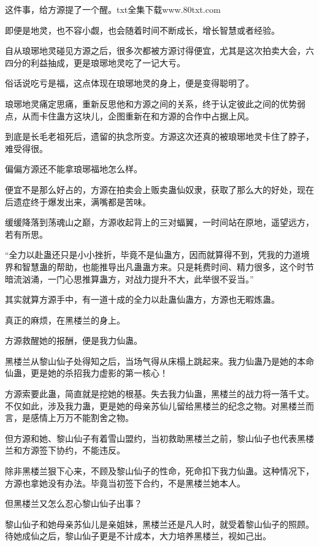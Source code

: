 
\begin{this_body}

这件事，给方源提了一个醒。txt全集下载www.80txt.com

即便是地灵，也不容小觑，也会随着时间不断成长，增长智慧或者经验。

自从琅琊地灵碰见方源之后，很多次都被方源讨得便宜，尤其是这次拍卖大会，六四分的利益抽成，更是琅琊地灵吃了一记大亏。

俗话说吃亏是福，这点体现在琅琊地灵的身上，便是变得聪明了。

琅琊地灵痛定思痛，重新反思他和方源之间的关系，终于认定彼此之间的优势弱点，从而卡住蛊方这块儿，企图重新在和方源的合作中占据上风。

到底是长毛老祖死后，遗留的执念所变。方源这次还真的被琅琊地灵卡住了脖子，难受得很。

偏偏方源还不能拿琅琊福地怎么样。

便宜不是那么好占的，方源在拍卖会上贩卖蛊仙奴隶，获取了那么大的好处，现在后遗症终于爆发出来，满嘴都是苦味。

缓缓降落到荡魂山之巅，方源收起背上的三对蝠翼，一时间站在原地，遥望远方，若有所思。

“全力以赴蛊还只是小小挫折，毕竟不是仙蛊方，因而就算得不到，凭我的力道境界和智慧蛊的帮助，也能推导出凡蛊蛊方来。只是耗费时间、精力很多，这个时节暗流汹涌，一门心思推算蛊方，对战力提升不大，此举很不妥当。”

其实就算方源手中，有一道十成的全力以赴蛊仙蛊方，方源也无暇炼蛊。

真正的麻烦，在黑楼兰的身上。

方源救醒她的报酬，便是我力仙蛊。

黑楼兰从黎山仙子处得知之后，当场气得从床榻上跳起来。我力仙蛊乃是她的本命仙蛊，更是她的杀招我力虚影的第一核心！

方源索要此蛊，简直就是挖她的根基。失去我力仙蛊，黑楼兰的战力将一落千丈。不仅如此，涉及我力蛊，更是她的母亲苏仙儿留给黑楼兰的纪念之物。对黑楼兰而言，是感情上万万不能割舍之物。

但方源和她、黎山仙子有着雪山盟约，当初救助黑楼兰之前，黎山仙子也代表黑楼兰和方源签下协约，不能违反。

除非黑楼兰狠下心来，不顾及黎山仙子的性命，死命扣下我力仙蛊。这种情况下，方源也拿她没有办法。毕竟当初签下合约，不是黑楼兰她本人。

但黑楼兰又怎么忍心黎山仙子出事？

黎山仙子和她母亲苏仙儿是亲姐妹，黑楼兰还是凡人时，就受着黎山仙子的照顾。待她成仙之后，黎山仙子更是不计成本，大力培养黑楼兰，视如己出。


\end{this_body}
